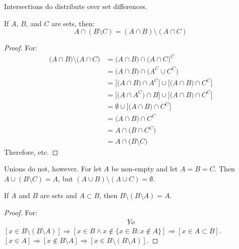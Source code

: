         Intersections do distribute over set differences.
        \begin{theorem}
            If $A$, $B$, and $C$ are sets, then:
            \begin{equation}
                A\cap(B\setminus{C})=
                (A\cap{B})\setminus(A\cap{C})
            \end{equation}
        \end{theorem}
        \begin{proof}
            For:
            \begin{subequations}
                \begin{align}
                    \big(A\cap{B}\big)\setminus
                        \big(A\cap{C}\big)
                    &=\big(A\cap{B}\big)
                        \cap\big(A\cap{C}\big)^{C}\\
                    &=\big(A\cap{B}\big)
                        \cap\big(A^{C}\cup{C}^{C}\big)\\
                    &=\big[\big(A\cap{B}\big)\cap{A}^{C}\big]
                        \cup\big[\big({A}\cap{B}\big)
                        \cap{C}^{C}\big]\\
                    &=\big[\big(A\cap{A}^{C}\big)\cap{B}\big]
                        \cup\big[\big(A\cap{B}\big)
                        \cap{C}^{C}\big]\\
                    &=\emptyset\cup\big[\big(A\cap{B}\big)
                        \cap{C}^{C}\big]\\
                    &=\big(A\cap{B}\big)\cap{C}^{C}\\
                    &=A\cap\big(B\cap{C}^{C}\big)\\
                    &=A\cap\big(B\setminus{C}\big)
                \end{align}
            \end{subequations}
            Therefore, etc.
        \end{proof}
        Unions do not, however. For let $A$ be non-empty
        and let $A=B=C$. Then $A\cup(B\setminus{C})=A$, but
        $(A\cup{B})\setminus(A\cup{C})=\emptyset$.
        \begin{theorem}
            If $A$ and $B$ are sets and $A\subset B$,
            then $B\setminus(B\setminus A)=A$.
        \end{theorem}
        \begin{proof}
            For:
            \begin{align}
                Yo
            \end{align}
            $[x\in B\setminus(B\setminus{A})]%
            \Rightarrow[x\in{B}\land{x}\notin%
            \{x\in{B}:x\notin{A}\}]%
            \Rightarrow[x\in{A}\subset{B}]$.
            $[x\in{A}]\Rightarrow[x\notin{B}\setminus{A}]%
            \Rightarrow[x\in{B}\setminus(B\setminus{A})]$.
        \end{proof}
